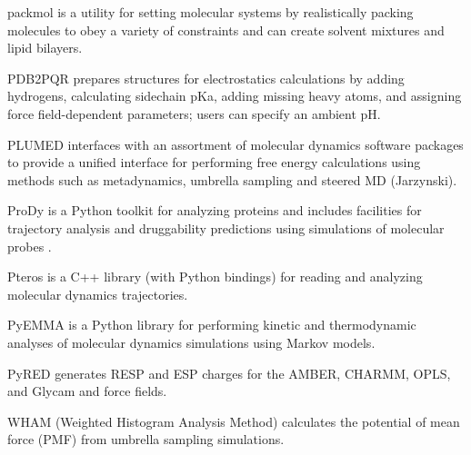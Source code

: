 packmol \cite{Mart_nez_2009} is a utility for setting molecular systems  by realistically packing molecules to obey a variety of constraints and can create solvent mixtures and lipid bilayers.

PDB2PQR \cite{Dolinsky_2007} prepares structures for electrostatics calculations by adding hydrogens, calculating sidechain pKa, adding missing heavy atoms, and assigning force field-dependent parameters; users can specify an ambient pH.

PLUMED \cite{Tribello_2014} interfaces with an assortment of molecular dynamics software packages to provide a unified interface for performing free energy calculations using methods such as metadynamics, umbrella sampling and steered MD (Jarzynski).

ProDy \cite{Bakan_2011} is a Python toolkit for analyzing proteins and includes facilities for trajectory analysis and druggability predictions using simulations of molecular probes \cite{Bakan_2012}.

Pteros \cite{Yesylevskyy_2015} is a C++ library (with Python bindings) for reading and analyzing molecular dynamics trajectories.

PyEMMA \cite{Scherer_2015} is a Python library for performing kinetic and thermodynamic analyses of molecular dynamics simulations using Markov models. 

PyRED \cite{Dupradeau_2010} generates RESP and ESP charges for the AMBER, CHARMM, OPLS, and Glycam and force fields.

WHAM (Weighted Histogram Analysis Method) calculates the potential of mean force (PMF) from umbrella sampling simulations.
